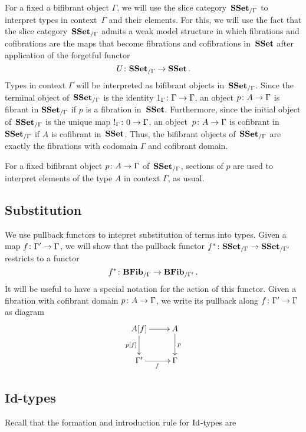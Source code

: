 \documentclass[reqno,10pt,a4paper,oneside,draft]{amsart}
\begin{document}
For a fixed a bifibrant object $\Gamma$, we will use the slice category~$\mathbf{SSet}_{/\Gamma}$
to interpret types in context~$\Gamma$ and their elements. For this, we will use the fact that the slice category~$\mathbf{SSet}_{/\Gamma}$ admits a weak model structure in which fibrations and cofibrations are the maps that become fibrations and cofibrations in~$\mathbf{SSet}$ after application of the forgetful functor 
\[
U \colon \mathbf{SSet}_{/\Gamma} \to \mathbf{SSet} \, .
\] 
Types in context $\Gamma$ will be interpreted as bifibrant objects in~$\mathbf{SSet}_{/\Gamma}$. Since the terminal object of~$\mathbf{SSet}_{/\Gamma}$ is the identity $1_\Gamma \colon \Gamma \to \Gamma$, an object $p \colon A \to \Gamma$ is fibrant in $\mathbf{SSet}_{/\Gamma}$ if $p$ is a fibration in~$\mathbf{SSet}$. Furthermore, since the initial object of~$\mathbf{SSet}_{/\Gamma}$ is the unique map
$!_\Gamma \colon 0 \to \Gamma$, an object~$p \colon A \to \Gamma$ is cofibrant in~$\mathbf{SSet}_{/\Gamma}$ if $A$ is cofibrant in~$\mathbf{SSet}$.
Thus, the bifibrant objects of~$\mathbf{SSet}_{/\Gamma}$ are exactly the fibrations with codomain $\Gamma$ and cofibrant domain.

For a fixed bifibrant object $p \colon A \to \Gamma$ of~$\mathbf{SSet}_{/\Gamma}$, sections of $p$ are used to interpret elements of the type $A$ in context $\Gamma$, as usual.

\smallskip


\subsection*{Substitution} 

We use pullback functors to intepret substitution of terms into types. Given a map $f \colon \Gamma' \to \Gamma$, we will show that the pullback functor $f^* \colon \mathbf{SSet}_{/\Gamma} \to \mathbf{SSet}_{/\Gamma'}$ restricts to a functor
\[
f^* \colon \mathbf{BFib}_{/\Gamma}  \to \mathbf{BFib}_{/\Gamma'} \, .
\]
It will be useful to have a special notation for the action of this functor. Given a fibration with cofibrant
domain $p \colon A \to \Gamma$, we write its pullback along $f \colon \Gamma' \to \Gamma$ as diagram
\[
\xymatrix{
A[f] \ar[r] \ar[d]_{p[f]} & A \ar[d]^p \\
\Gamma' \ar[r]_f & \Gamma }
\]

\subsection*{$\mathbf{Id}$-types} Recall that the formation and introduction rule for $\operatorname{Id}$-types are
\end{document}
